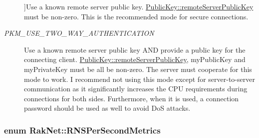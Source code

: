 \begin{Desc}
\begin{description}
{}]Use a known remote server public key. \hyperlink{struct_rak_net_1_1_public_key_a0a916a5ef434100665be009fd4814f69}{Public\-Key\-::remote\-Server\-Public\-Key} must be non-\/zero. This is the recommended mode for secure connections. \item[{\em 
\hypertarget{namespace_rak_net_a415b479158fd361610df230a53b35b02add05a6daf150749ca2def6a48a4dd968}{P\-K\-M\-\_\-\-U\-S\-E\-\_\-\-T\-W\-O\-\_\-\-W\-A\-Y\-\_\-\-A\-U\-T\-H\-E\-N\-T\-I\-C\-A\-T\-I\-O\-N}\label{namespace_rak_net_a415b479158fd361610df230a53b35b02add05a6daf150749ca2def6a48a4dd968}
}]Use a known remote server public key A\-N\-D provide a public key for the connecting client. \hyperlink{struct_rak_net_1_1_public_key_a0a916a5ef434100665be009fd4814f69}{Public\-Key\-::remote\-Server\-Public\-Key}, my\-Public\-Key and my\-Private\-Key must be all be non-\/zero. The server must cooperate for this mode to work. I recommend not using this mode except for server-\/to-\/server communication as it significantly increases the C\-P\-U requirements during connections for both sides. Furthermore, when it is used, a connection password should be used as well to avoid Do\-S attacks. \end{description}
\end{Desc}
\hypertarget{namespace_rak_net_ada2bfa976ee507869dc9f3ef0c11134d}{
\subsubsection[{R\-N\-S\-Per\-Second\-Metrics}]{\setlength{\rightskip}{0pt plus 5cm}enum {\bf Rak\-Net\-::\-R\-N\-S\-Per\-Second\-Metrics}}}\label{namespace_rak_net_ada2bfa976ee507869dc9f3ef0c11134d}
